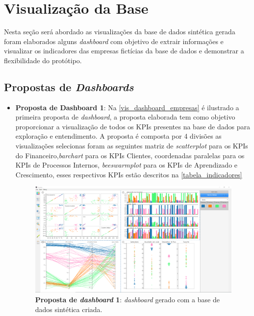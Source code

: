 \documentclass[
	12pt,				%
	openright,			%
	oneside,			%
	a4paper,			%
	english,			%
	brazil				%
	]{abntex2}
\begin{document}
\section{Visualização da Base}
Nesta seção será abordado as visualizações da base de dados sintética gerada foram elaborados alguns \textit{dashboard} com objetivo de extrair informações e visualizar os indicadores das empresas fictícias da base de dados e demonstrar a flexibilidade do protótipo.

\subsection{Propostas de \textit{Dashboards}}
\begin{itemize}
    \item \textbf{Proposta de Dashboard 1}:
    Na \autoref{vis_dashboard_empresas} é ilustrado a primeira proposta de \textit{dashboard}, a proposta elaborada tem como objetivo proporcionar a visualização de todos os KPIs presentes na base de dados para exploração e entendimento. A proposta é composta por 4 divisões as visualizações selecionas foram as seguintes matriz de \textit{scatterplot} para os KPIs do Financeiro,\textit{barchart} para os KPIs Clientes, coordenadas paralelas para os KPIs de Processos Internos, \textit{beeswarmplot} para os KPIs  de Aprendizado e Crescimento, esses respectivos KPIs estão descritos na \autoref{tabela_indicadores}
    
    \begin{figure}[h]
	    \caption{\label{vis_dashboard_empresas}
	    \textbf{Proposta de \textit{dashboard} 1}: \textit{dashboard} gerado com a base de dados sintética criada.
        }
	\begin{center}
	    \includegraphics[width=\textwidth]{figures/dash1.png}
	\end{center}
    \end{figure}


\end{itemize}
\end{document}
